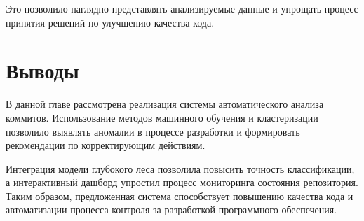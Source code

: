 Это позволило наглядно представлять анализируемые данные и упрощать процесс принятия решений по улучшению качества кода.

\section{Выводы} \label{ch3:conclusion}

В данной главе рассмотрена реализация системы автоматического анализа коммитов. Использование методов машинного обучения и кластеризации позволило выявлять аномалии в процессе разработки и формировать рекомендации по корректирующим действиям. 

Интеграция модели глубокого леса позволила повысить точность классификации, а интерактивный дашборд упростил процесс мониторинга состояния репозитория. Таким образом, предложенная система способствует повышению качества кода и автоматизации процесса контроля за разработкой программного обеспечения.
